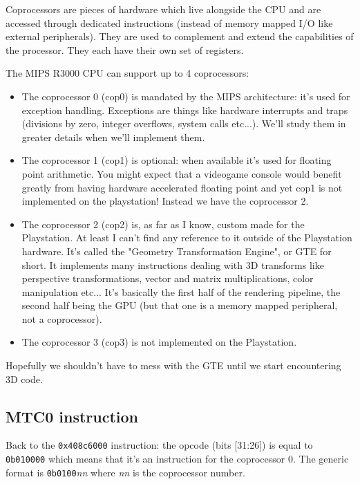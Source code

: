 \documentclass[a4paper]{article}
\newcommand{\code}[1] {\texttt{#1}}
\begin{document}
Coprocessors are pieces of hardware which live alongside the CPU and
are accessed through dedicated instructions (instead of memory mapped
I/O like external peripherals). They are used to complement and extend
the capabilities of the processor. They each have their own set of
registers.

The MIPS R3000 CPU can support up to 4 coprocessors:

\begin{itemize}
\item The coprocessor 0 (cop0) is mandated by the MIPS architecture:
  it's used for exception handling. Exceptions are things like
  hardware interrupts and traps (divisions by zero, integer overflows,
  system calls etc...). We'll study them in greater details when we'll
  implement them.

\item The coprocessor 1 (cop1) is optional: when available it's used for
  floating point arithmetic. You might expect that a videogame console
  would benefit greatly from having hardware accelerated floating point
  and yet cop1 is not implemented on the playstation! Instead we have
  the coprocessor 2.

\item The coprocessor 2 (cop2) is, as far as I know, custom made for
  the Playstation. At least I can't find any reference to it outside
  of the Playstation hardware. It's called the "Geometry
  Transformation Engine", or GTE for short. It implements many
  instructions dealing with 3D transforms like perspective
  transformations, vector and matrix multiplications, color
  manipulation etc... It's basically the first half of the rendering
  pipeline, the second half being the GPU (but that one is a memory
  mapped peripheral, not a coprocessor).

\item The coprocessor 3 (cop3) is not implemented on the Playstation.
\end{itemize}

Hopefully we shouldn't have to mess with the GTE until we start
encountering 3D code.

\subsection{MTC0 instruction}

Back to the \code{0x408c6000} instruction: the opcode (bits [31:26])
is equal to \code{0b010000} which means that it's an instruction for
the coprocessor 0. The generic format is \code{0b0100}\emph{nn} where
\emph{nn} is the coprocessor number.
\end{document}
